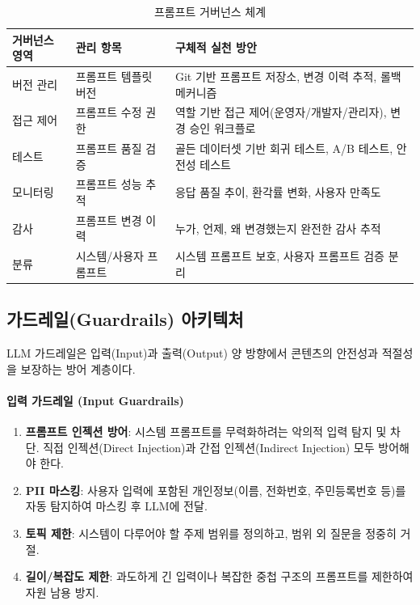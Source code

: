 \begin{table}[htbp]
\centering
\caption{프롬프트 거버넌스 체계}
\label{tab:prompt_governance}
\begin{tabularx}{\textwidth}{p{2.5cm}p{3cm}X}
\toprule
\textbf{거버넌스 영역} & \textbf{관리 항목} & \textbf{구체적 실천 방안} \\
\midrule
버전 관리 & 프롬프트 템플릿 버전 & Git 기반 프롬프트 저장소, 변경 이력 추적, 롤백 메커니즘 \\
\midrule
접근 제어 & 프롬프트 수정 권한 & 역할 기반 접근 제어(운영자/개발자/관리자), 변경 승인 워크플로 \\
\midrule
테스트 & 프롬프트 품질 검증 & 골든 데이터셋 기반 회귀 테스트, A/B 테스트, 안전성 테스트 \\
\midrule
모니터링 & 프롬프트 성능 추적 & 응답 품질 추이, 환각률 변화, 사용자 만족도 \\
\midrule
감사 & 프롬프트 변경 이력 & 누가, 언제, 왜 변경했는지 완전한 감사 추적 \\
\midrule
분류 & 시스템/사용자 프롬프트 & 시스템 프롬프트 보호, 사용자 프롬프트 검증 분리 \\
\bottomrule
\end{tabularx}
\end{table}


\subsection{가드레일(Guardrails) 아키텍처}
\label{sec:13.5.2}

LLM 가드레일은 입력(Input)과 출력(Output) 양 방향에서 콘텐츠의 안전성과 적절성을 보장하는 방어 계층이다.

\paragraph{입력 가드레일 (Input Guardrails)}

\begin{enumerate}
 \item \textbf{프롬프트 인젝션 방어}: 시스템 프롬프트를 무력화하려는 악의적 입력 탐지 및 차단. 직접 인젝션(Direct Injection)과 간접 인젝션(Indirect Injection) 모두 방어해야 한다.
 \item \textbf{PII 마스킹}: 사용자 입력에 포함된 개인정보(이름, 전화번호, 주민등록번호 등)를 자동 탐지하여 마스킹 후 LLM에 전달.
 \item \textbf{토픽 제한}: 시스템이 다루어야 할 주제 범위를 정의하고, 범위 외 질문을 정중히 거절.
 \item \textbf{길이/복잡도 제한}: 과도하게 긴 입력이나 복잡한 중첩 구조의 프롬프트를 제한하여 자원 남용 방지.
\end{enumerate}

